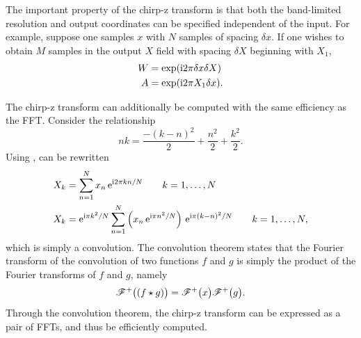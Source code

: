 The important property of the chirp-z transform is that both the
band-limited resolution and output coordinates can be specified independent of the input.
For example, suppose one samples $x$ with $N$ samples
of spacing $\delta x$.  If one wishes to obtain $M$ samples in the output
$X$ field with spacing $\delta X$ beginning with $X_1$,
\begin{align}
								W&=\exp({\mathrm{i}} 2 \pi \delta x \delta X)\\
								A&=\exp({\mathrm{i}} 2 \pi X_1 \delta x).
\end{align}

The chirp-z transform can additionally be computed with the same efficiency
as the FFT\@.  Consider the relationship
\begin{equation}
				n k = \frac{-{(k-n)}^2}{2} + \frac{n^2}{2} + \frac{k^2}{2}.
\label{eqn:relationshipfargodingus}
\end{equation}
Using ,  can be rewritten
\begin{align}
								X_k &= \sum_{n=1}^{N} x_n\, {\mathrm{e}}^{{\mathrm{i}} 2\pi k n/N} \qquad k=1,\ldots,N\\
								X_k &= {\mathrm{e}}^{{\mathrm{i}} \pi k^2/N} \sum_{n=1}^{N} \left(x_n\, {\mathrm{e}}^{{\mathrm{i}} \pi n^2/N}\right)\,
								{\mathrm{e}}^{{\mathrm{i}} \pi{(k-n)}^2/N}\qquad k=1,\ldots,N,
\end{align}
which is simply a convolution.  The convolution theorem
states that the Fourier transform of the
convolution of two functions $f$ and $g$ is simply the product of the
Fourier transforms of $f$ and $g$, namely
\begin{equation}
{\mathscr{F}^{+}\bigl(\left(f \star g\right)\bigr)} = {\mathscr{F}^{+}\bigl(x\bigr)}{\mathscr{F}^{+}\bigl(g\bigr)}.
\end{equation}
Through the convolution theorem, the chirp-z transform can be expressed as
a pair of FFTs, and thus be efficiently computed.
